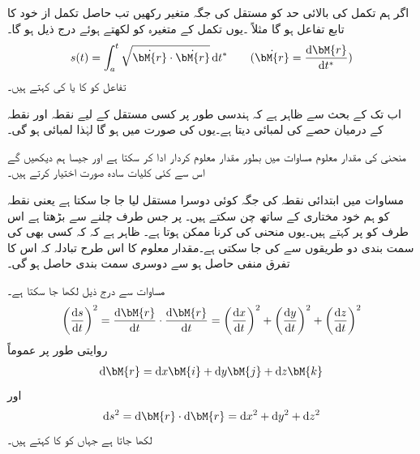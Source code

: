اگر ہم تکمل کی بالائی حد کو مستقل  کی جگہ متغیر  رکھیں تب حاصل تکمل از خود  کا تابع تفاعل ہو گا مثلاً ۔یوں تکمل کے متغیرہ کو  لکھتے ہوئے درج ذیل ہو گا۔
\begin{align}\label{مساوات_الاحصاء_لمبائی_منحنی_ب}
s(t)=\int_a^t \sqrt{\dot{\bM{r}}\cdot \dot{\bM{r}}}\dif t^* \quad \quad (\dot{\bM{r}}=\frac{\dif \bM{r}}{\dif t^*})
\end{align}
تفاعل  کو  کا  یا  کی  کہتے ہیں۔  

اب تک کے بحث سے ظاہر ہے کہ ہندسی طور پر  کسی مستقل  کے لیے  نقطہ  اور نقطہ  کے درمیان حصے کی لمبائی دیتا ہے۔یوں  کی صورت میں  ہو گا لہٰذا لمبائی  ہو گی۔

منحنی کی مقدار معلوم مساوات میں  بطور مقدار معلوم کردار ادا کر سکتا ہے  اور جیسا ہم دیکھیں گے اس سے کئی کلیات سادہ صورت اختیار کرتے ہیں۔

مساوات  میں ابتدائی نقطہ  کی جگہ  کوئی دوسرا مستقل لیا جا جا سکتا ہے یعنی نقطہ  کو  ہم خود مختاری کے ساتھ چن سکتے ہیں۔ پر جس طرف چلنے سے  بڑھتا ہے اس  طرف کو  پر  کہتے ہیں۔یوں منحنی کی  کرنا ممکن ہوتا ہے۔ ظاہر ہے کہ کہ کسی بھی  کی سمت بندی دو طریقوں سے کی جا سکتی ہے۔مقدار معلوم کا اس طرح تبادلہ کہ اس کا تفرق منفی حاصل ہو سے  دوسری سمت بندی حاصل ہو گی۔

مساوات  سے درج ذیل لکھا جا سکتا ہے۔
\begin{align}\label{مساوات_الاحصاء_لمبائی_قوس_تفرق}
\left(\frac{\dif s}{\dif t}\right)^2=\frac{\dif \bM{r}}{\dif t}\cdot \frac{\dif \bM{r}}{\dif t}=\left(\frac{\dif x}{\dif t}\right)^2+\left(\frac{\dif y}{\dif t}\right)^2+\left(\frac{\dif z}{\dif t}\right)^2
\end{align}
روایتی طور پر عموماً
\begin{align*}
\dif \bM{r}=\dif x\bM{i}+\dif y\bM{j}+\dif z\bM{k}
\end{align*}
اور
\begin{align}\label{مساوات_الاحصاء_لمبائی_قوس_چھوٹا_حصہ}
\dif s^2=\dif \bM{r}\cdot \dif \bM{r}=\dif x^2+\dif y^2+\dif z^2
\end{align}
لکھا جاتا ہے جہاں  کو  کا  کہتے ہیں۔

